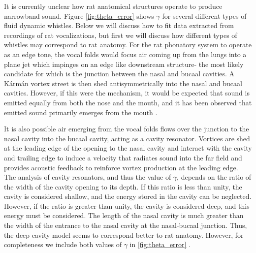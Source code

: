 \documentclass[twocolumn, prl]{revtex4}
\begin{document}
It is currently unclear how rat anatomical structures operate to produce narrowband sound. Figure \ref{fig:theta_error} shows $\gamma$ for several different types of fluid dynamic whistles. Below we will discuss how to fit data extracted from recordings of rat vocalizations, but first we will discuss how different types of whistles may correspond to rat anatomy. For the rat phonatory system to operate as an edge tone, the vocal folds would focus air coming up from the lungs into a plane jet which impinges on an edge like downstream structure- the most likely candidate for which is the junction between the nasal and bucaal cavities. A Kármán vortex street is then shed antisymmetrically into the nasal and bucaal cavities. However, if this were the mechanism, it would be expected that sound is emitted equally from both the nose and the mouth, and it has been observed that emitted sound primarily emerges from the mouth \cite{Holger1977,Howe2008}.

It is also possible air emerging from the vocal folds flows over the junction to the nasal cavity into the bucaal cavity, acting as a cavity resonator. Vortices are shed at the leading edge of the opening to the nasal cavity and interact with the cavity and trailing edge to induce a velocity that radiates sound into the far field and provides acoustic feedback to reinforce vortex production at the leading edge. The analysis of cavity resonators, and thus the value of $\gamma$, depends on the ratio of the width of the cavity opening to its depth. If this ratio is less than unity, the cavity is considered shallow, and the energy stored in the cavity can be neglected. However, if the ratio is greater than unity, the cavity is considered deep, and this energy must be considered. The length of the nasal cavity is much greater than the width of the entrance to the nasal cavity at the nasal-bucaal junction. Thus, the deep cavity model seems to correspond better to rat anatomy. However, for completeness we include both values of $\gamma$ in \ref{fig:theta_error} \cite{Howe2008}.
\end{document}
